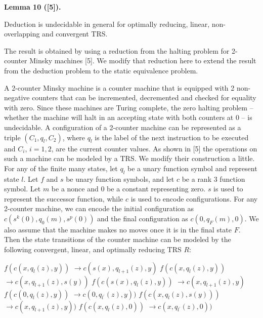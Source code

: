\documentclass[10pt,a4paper]{amsart}
\begin{document}
 
 
\par\medskip\noindent\textbf{Lemma 10 ([5]).}\par
 
 
Deduction is undecidable in general for optimally reducing, linear, non-overlapping and convergent TRS.\par
 
 
 
 
The result is obtained by using a reduction from the halting problem for 2-counter Minsky machines [5]. We modify that reduction here to extend the result from the deduction problem to the static equivalence problem.\par
 
 
 
A 2-counter Minsky machine is a counter machine that is equipped with 2 non-negative counters that can be incremented, decremented and checked for equality with zero. Since these machines are Turing complete, the zero halting problem – whether the machine will halt in an accepting state with both counters at 0 – is undecidable. A configuration of a 2-counter machine can be represented as a triple $(C_{1},q_{l},C_{2})$, where $q_{l}$ is the label of the next instruction to be executed and $C_{i}$, $i=1,2$, are the current counter values. As shown in [5] the operations on such a machine can be modeled by a TRS. We modify their construction a little. For any of the finite many states, let $q_{l}$ be a unary function symbol and represent state $l$. Let $f$ and $s$ be unary function symbols, and let $c$ be a rank 3 function symbol. Let $m$ be a nonce and $0$ be a constant representing zero. $s$ is used to represent the successor function, while $c$ is used to encode configurations. For any 2-counter machine, we can encode the initial configuration as $c(s^{k}(0),q_{0}(m),s^{p}(0))$ and the final configuration as $c(0,q_{F}(m),0)$. We also assume that the machine makes no moves once it is in the final state $F$. Then the state transitions of the counter machine can be modeled by the following convergent, linear, and optimally reducing TRS $R$:\par
    $\displaystyle f(c(x,q_{l}(z),y))$ $\displaystyle\rightarrow c(s(x),q_{l+1}(z),y)$     $\displaystyle f(c(x,q_{l}(z),y))$ $\displaystyle\rightarrow c(x,q_{l+1}(z),s(y))$     $\displaystyle f(c(s(x),q_{l}(z),y))$ $\displaystyle\rightarrow c(x,q_{l+1}(z),y)$     $\displaystyle f(c(0,q_{l}(z),y))$ $\displaystyle\rightarrow c(0,q_{l^{\prime}}(z),y))$     $\displaystyle f(c(x,q_{l}(z),s(y)))$ $\displaystyle\rightarrow c(x,q_{l+1}(z),y))$     $\displaystyle f(c(x,q_{l}(z),0))$ $\displaystyle\rightarrow c(x,q_{l^{\prime}}(z),0))$    
 
\end{document}
